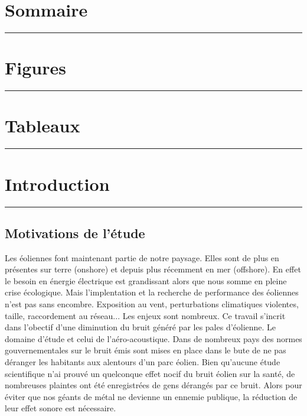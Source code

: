 \documentclass[12pt]{article}
\theoremstyle{plain}
\theoremstyle{remark}
\begin{document}
	\newpage
	
	\section*{Sommaire}
	
	\noindent\rule{\textwidth}{0.3pt}
	\vspace{0.5cm}
	

\clearpage
\section*{\Large Figures}
\noindent\rule{\textwidth}{0.3pt}
\vspace{0.5cm}

\listoffigures

\clearpage
\section*{\Large Tableaux}
\noindent\rule{\textwidth}{0.3pt}
\vspace{0.5cm}

\listoftables
	
\clearpage
	
	
	\section{Introduction}
	\noindent\rule{\linewidth}{2pt}
	\vspace{0.1cm}
	\subsection{Motivations de l'étude}
	
	Les éoliennes font maintenant partie de notre paysage. Elles sont de plus en présentes sur terre (onshore) et depuis plus récemment en mer (offshore). En effet le besoin en énergie électrique est grandissant alors que nous somme en pleine crise écologique. Mais l'implentation et la recherche de performance des éoliennes n'est pas sans encombre. Exposition au vent, perturbations climatiques violentes, taille, raccordement au réseau... Les enjeux sont nombreux. Ce travail s'incrit dans l'obectif d'une diminution du bruit généré par les pales d'éolienne. Le domaine d'étude et celui de l'aéro-acoustique. Dans de nombreux pays des normes gouvernementales sur le bruit émis \cite{impactacoustique2023} sont mises en place dans le bute de ne pas déranger les habitants aux alentours d'un parc éolien. Bien qu'aucune étude scientifique n'ai prouvé un quelconque effet nocif du bruit éolien sur la santé, de nombreuses plaintes ont été enregistrées de gens dérangés par ce bruit. Alors pour éviter que nos géants de métal ne devienne un ennemie publique, la réduction de leur effet sonore est nécessaire. \\
	
\end{document}
